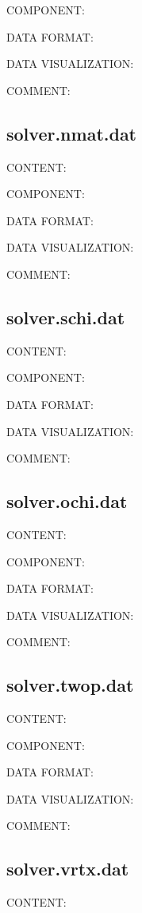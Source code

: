 {\color{green}COMPONENT:}

{\color{blue}DATA FORMAT:}

{\color{brown}DATA VISUALIZATION:}

{\color{purple}COMMENT:}

\subsection{solver.nmat.dat}
{\color{red}CONTENT:}

{\color{green}COMPONENT:}

{\color{blue}DATA FORMAT:}

{\color{brown}DATA VISUALIZATION:}

{\color{purple}COMMENT:}

\subsection{solver.schi.dat}
{\color{red}CONTENT:}

{\color{green}COMPONENT:}

{\color{blue}DATA FORMAT:}

{\color{brown}DATA VISUALIZATION:}

{\color{purple}COMMENT:}

\subsection{solver.ochi.dat}
{\color{red}CONTENT:}

{\color{green}COMPONENT:}

{\color{blue}DATA FORMAT:}

{\color{brown}DATA VISUALIZATION:}

{\color{purple}COMMENT:}

\subsection{solver.twop.dat}
{\color{red}CONTENT:}

{\color{green}COMPONENT:}

{\color{blue}DATA FORMAT:}

{\color{brown}DATA VISUALIZATION:}

{\color{purple}COMMENT:}

\subsection{solver.vrtx.dat}
{\color{red}CONTENT:}

